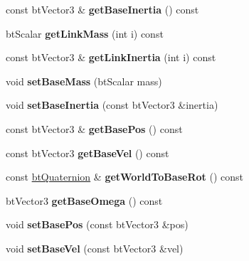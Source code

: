 \begin{DoxyCompactItemize}
\item 
\mbox{\label{classbtMultiBody_ab4977e6b92d827181e692f40b5b369b4}} 
const bt\+Vector3 \& {\bfseries get\+Base\+Inertia} () const
\item 
\mbox{\label{classbtMultiBody_a78329f2e10efd268859ee7678399371a}} 
bt\+Scalar {\bfseries get\+Link\+Mass} (int i) const
\item 
\mbox{\label{classbtMultiBody_a453c9cda7ebfab34c55b32f474c653a5}} 
const bt\+Vector3 \& {\bfseries get\+Link\+Inertia} (int i) const
\item 
\mbox{\label{classbtMultiBody_a39b17484fc121b0ec1f859e0f50e7552}} 
void {\bfseries set\+Base\+Mass} (bt\+Scalar mass)
\item 
\mbox{\label{classbtMultiBody_a4043d6629d0585f67c8a82d0274ff17c}} 
void {\bfseries set\+Base\+Inertia} (const bt\+Vector3 \&inertia)
\item 
\mbox{\label{classbtMultiBody_a6ab72a604e9b46014ffe25ff382fccb8}} 
const bt\+Vector3 \& {\bfseries get\+Base\+Pos} () const
\item 
\mbox{\label{classbtMultiBody_af47f09548d54af89ff1ae56e8559114e}} 
const bt\+Vector3 {\bfseries get\+Base\+Vel} () const
\item 
\mbox{\label{classbtMultiBody_a621aef7b0eea3c88b2a915152f568df8}} 
const \hyperlink{classbtQuaternion}{bt\+Quaternion} \& {\bfseries get\+World\+To\+Base\+Rot} () const
\item 
\mbox{\label{classbtMultiBody_a6ba0afb89acd01b4842959c2d53f7d81}} 
bt\+Vector3 {\bfseries get\+Base\+Omega} () const
\item 
\mbox{\label{classbtMultiBody_a7860a23d986ca40ca24112fc4870e9db}} 
void {\bfseries set\+Base\+Pos} (const bt\+Vector3 \&pos)
\item 
\mbox{\label{classbtMultiBody_a559187909a25d3fb42140abf079d84cd}} 
void {\bfseries set\+Base\+Vel} (const bt\+Vector3 \&vel)

\end{DoxyCompactItemize}
